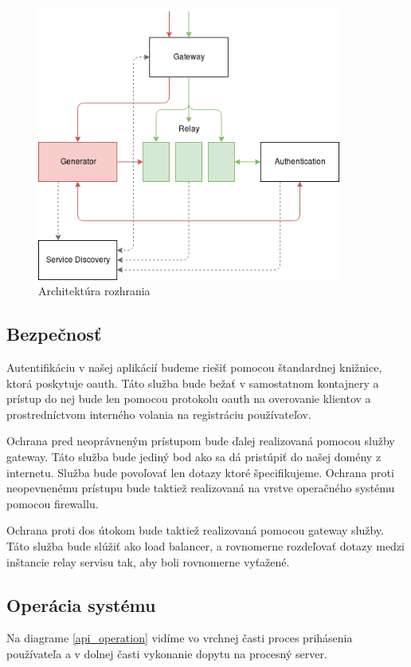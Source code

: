 \begin{figure}[!htbp] 
	\centering 
	\includegraphics[width=10cm]{img/architecture.png} 
	\caption{Architektúra rozhrania} 
	\label{architecture} 
\end{figure}  

\subsection{Bezpečnosť} 

Autentifikáciu v našej aplikácií budeme riešiť pomocou štandardnej knižnice, ktorá poskytuje \acrshort{oauth}. Táto služba bude bežať v samostatnom kontajnery a prístup do nej bude len pomocou protokolu \acrshort{oauth} na overovanie klientov a prostredníctvom interného volania na registráciu používateľov. 

Ochrana pred neoprávneným prístupom bude ďalej realizovaná pomocou služby gateway. Táto služba bude jediný bod ako sa dá pristúpiť do našej domény z internetu. Služba bude povoľovať len dotazy ktoré špecifikujeme. Ochrana proti neopevnenému prístupu bude taktiež realizovaná na vrstve operačného systému pomocou firewallu. 

Ochrana proti \acrshort{dos} útokom bude taktiež realizovaná pomocou gateway služby. Táto služba bude slúžiť ako load balancer, a rovnomerne rozdeľovať dotazy medzi inštancie relay servisu tak, aby boli rovnomerne vyťažené.



\subsection{Operácia systému} 
Na diagrame \ref{api_operation} vidíme vo vrchnej časti proces prihásenia používateľa a v dolnej časti vykonanie dopytu na procesný server. 

